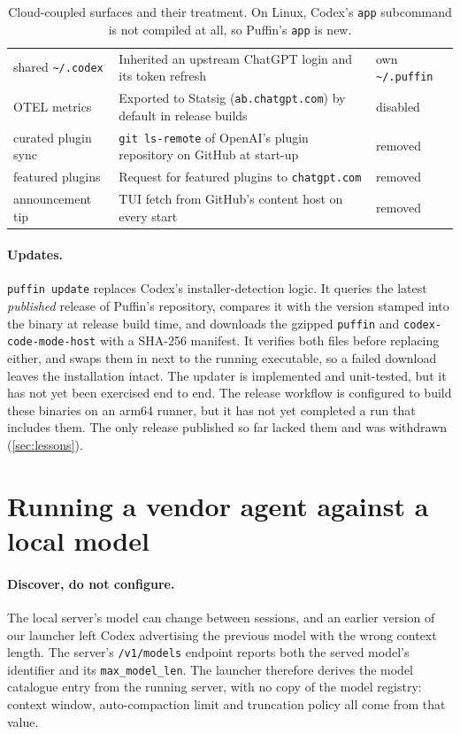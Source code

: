 \documentclass[11pt]{article}
\newcommand{\code}[1]{\texttt{#1}}
\begin{document}
\begin{table}[t]
\begin{tabularx}{\linewidth}{@{}l X l@{}}
shared \code{\textasciitilde/.codex} & Inherited an upstream ChatGPT login and its token refresh & own \code{\textasciitilde/.puffin} \\
OTEL metrics & Exported to Statsig (\code{ab.chatgpt.com}) by default in release builds & disabled \\
curated plugin sync & \code{git ls-remote} of OpenAI's plugin repository on GitHub at start-up & removed \\
featured plugins & Request for featured plugins to \code{chatgpt.com} & removed \\
announcement tip & TUI fetch from GitHub's content host on every start & removed \\
\bottomrule
\end{tabularx}
\caption{Cloud-coupled surfaces and their treatment. On Linux, Codex's \code{app} subcommand is
not compiled at all, so Puffin's \code{app} is new.}
\label{tab:cloud}
\end{table}

\paragraph{Updates.} \code{puffin update} replaces Codex's installer-detection logic. It queries the
latest \emph{published} release of Puffin's repository, compares it with the version stamped into
the binary at release build time, and downloads the gzipped \code{puffin} and
\code{codex-code-mode-host} with a SHA-256 manifest. It verifies both files before replacing either,
and swaps them in next to the running executable, so a failed download leaves the installation
intact. The updater is implemented and unit-tested, but it has not yet been exercised end to end.
The release workflow is configured to build these binaries on an arm64 runner, but it has not yet
completed a run that includes them. The only release published so far lacked them and was
withdrawn (\cref{sec:lessons}).

\section{Running a vendor agent against a local model}
\label{sec:local}

\paragraph{Discover, do not configure.} The local server's model can change between sessions, and
an earlier version of our launcher left Codex advertising the previous model with the wrong context
length. The server's \code{/v1/models} endpoint reports both the served model's identifier and its
\code{max\_model\_len}. The launcher therefore derives the model catalogue entry from the running
server, with no copy of the model registry: context window, auto-compaction limit and truncation
policy all come from that value.
\end{document}
